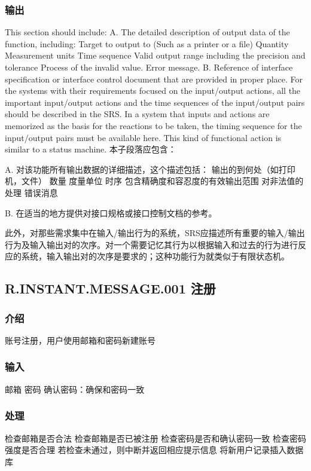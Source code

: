 \subsubsection{输出}
This section should include:
A. The detailed description of output data of the function, including:
		Target to output to (Such as a printer or a file)
		Quantity
		Measurement units
		Time sequence
		Valid output range including the precision and tolerance
		Process of the invalid value.
		Error message.
B. Reference of interface specification or interface control document that are provided in proper place.
For the systems with their requirements focused on the input/output actions, all the important input/output actions and the time sequences of the input/output pairs should be described in the SRS. In a system that inputs and actions are memorized as the basis for the reactions to be taken, the timing sequence for the input/output pairs must be available here. This kind of functional action is similar to a status machine.  
本子段落应包含：

A. 对该功能所有输出数据的详细描述，这个描述包括：
		输出的到何处（如打印机，文件）
		数量
		度量单位
		时序
		包含精确度和容忍度的有效输出范围
		对非法值的处理
		错误消息
		
B. 在适当的地方提供对接口规格或接口控制文档的参考。

此外，对那些需求集中在输入/输出行为的系统，SRS应描述所有重要的输入/输出行为及输入输出对的次序。对一个需要记忆其行为以根据输入和过去的行为进行反应的系统，输入输出对的次序是要求的；这种功能行为就类似于有限状态机。

\subsection{R.INSTANT.MESSAGE.001 注册}
\subsubsection{介绍}
账号注册，用户使用邮箱和密码新建账号
\subsubsection{输入}
邮箱
密码
确认密码：确保和密码一致
\subsubsection{处理}
检查邮箱是否合法
检查邮箱是否已被注册
检查密码是否和确认密码一致
检查密码强度是否合理
若检查未通过，则中断并返回相应提示信息
将新用户记录插入数据库

